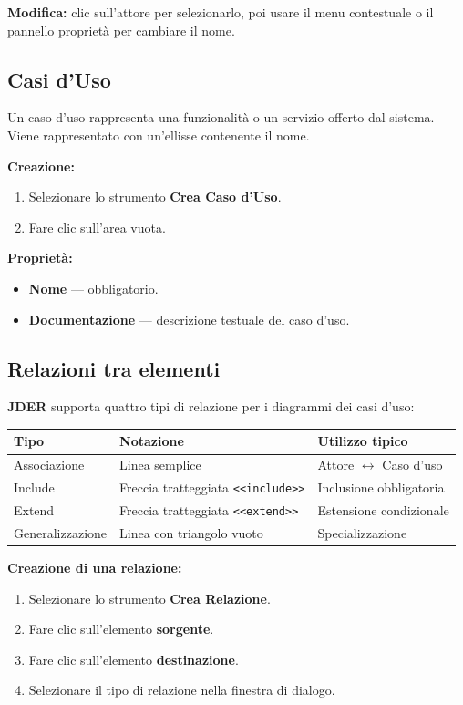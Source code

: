 \documentclass[a4paper,11pt]{article}
\newcommand{\uielement}[1]{\textbf{#1}}
\newcommand{\jder}{\textbf{JDER}}
\begin{document}
\textbf{Modifica:} clic sull'attore per selezionarlo, poi usare il menu contestuale
o il pannello proprietà per cambiare il nome.

\subsection{Casi d'Uso}

Un caso d'uso rappresenta una funzionalità o un servizio offerto dal sistema. Viene rappresentato
con un'ellisse contenente il nome.

\textbf{Creazione:}
\begin{enumerate}
  \item Selezionare lo strumento \uielement{Crea Caso d'Uso}.
  \item Fare clic sull'area vuota.
\end{enumerate}

\textbf{Proprietà:}
\begin{itemize}
  \item \textbf{Nome} --- obbligatorio.
  \item \textbf{Documentazione} --- descrizione testuale del caso d'uso.
\end{itemize}

\subsection{Relazioni tra elementi}

\jder{} supporta quattro tipi di relazione per i diagrammi dei casi d'uso:

\begin{center}
\begin{tabular}{@{}lll@{}}
  \toprule
  \textbf{Tipo} & \textbf{Notazione} & \textbf{Utilizzo tipico} \\
  \midrule
  Associazione     & Linea semplice                  & Attore $\leftrightarrow$ Caso d'uso \\
  Include          & Freccia tratteggiata \texttt{<<include>>} & Inclusione obbligatoria \\
  Extend           & Freccia tratteggiata \texttt{<<extend>>}  & Estensione condizionale \\
  Generalizzazione & Linea con triangolo vuoto        & Specializzazione \\
  \bottomrule
\end{tabular}
\end{center}

\textbf{Creazione di una relazione:}
\begin{enumerate}
  \item Selezionare lo strumento \uielement{Crea Relazione}.
  \item Fare clic sull'elemento \textbf{sorgente}.
  \item Fare clic sull'elemento \textbf{destinazione}.
  \item Selezionare il tipo di relazione nella finestra di dialogo.
\end{enumerate}
\end{document}
